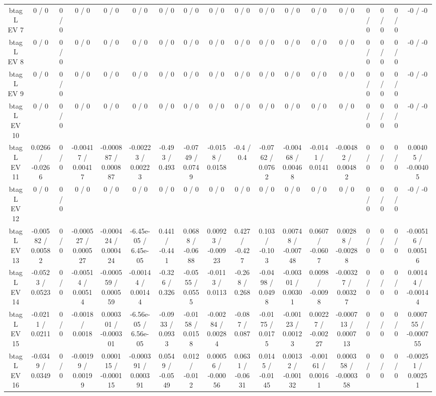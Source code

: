 \documentclass[10pt]{article}
\begin{document}
\begin{table}[htbp]
\begin{center}
\begin{tabular}{|c|c|c|c|c|c|c|c|c|c|c|c|c|c|c|c|c|c|}
  btag L EV 7 & 0 / 0 & 0 / 0 & 0 / 0 & 0 / 0 & 0 / 0 & 0 / 0 & 0 / 0 & 0 / 0 & 0 / 0 & 0 / 0 & 0 / 0 & 0 / 0 & 0 / 0 & 0 / 0 & 0 / 0 & 0 / 0 & -0 / -0 \\ 
  btag L EV 8 & 0 / 0 & 0 / 0 & 0 / 0 & 0 / 0 & 0 / 0 & 0 / 0 & 0 / 0 & 0 / 0 & 0 / 0 & 0 / 0 & 0 / 0 & 0 / 0 & 0 / 0 & 0 / 0 & 0 / 0 & 0 / 0 & -0 / -0 \\ 
  btag L EV 9 & 0 / 0 & 0 / 0 & 0 / 0 & 0 / 0 & 0 / 0 & 0 / 0 & 0 / 0 & 0 / 0 & 0 / 0 & 0 / 0 & 0 / 0 & 0 / 0 & 0 / 0 & 0 / 0 & 0 / 0 & 0 / 0 & -0 / -0 \\ 
  btag L EV 10 & 0 / 0 & 0 / 0 & 0 / 0 & 0 / 0 & 0 / 0 & 0 / 0 & 0 / 0 & 0 / 0 & 0 / 0 & 0 / 0 & 0 / 0 & 0 / 0 & 0 / 0 & 0 / 0 & 0 / 0 & 0 / 0 & -0 / -0 \\ 
  btag L EV 11 & 0.0266 / -0.0266 & 0 / 0 & -0.00417 / 0.00417 & -0.000887 / 0.000887 & -0.00223 / 0.00223 & -0.493 / 0.493 & -0.0749 / 0.0749 & -0.0158 / 0.0158 & -0.4 / 0.4 & -0.0762 / 0.0762 & -0.00468 / 0.00468 & -0.0141 / 0.0141 & -0.00482 / 0.00482 & 0 / 0 & 0 / 0 & 0 / 0 & 0.00405 / -0.00405 \\ 
  btag L EV 12 & 0 / 0 & 0 / 0 & 0 / 0 & 0 / 0 & 0 / 0 & 0 / 0 & 0 / 0 & 0 / 0 & 0 / 0 & 0 / 0 & 0 / 0 & 0 / 0 & 0 / 0 & 0 / 0 & 0 / 0 & 0 / 0 & -0 / -0 \\ 
  btag L EV 13 & -0.00582 / 0.00582 & 0 / 0 & -0.000527 / 0.000527 & -0.000424 / 0.000424 & -6.45e-05 / 6.45e-05 & 0.441 / -0.441 & 0.0688 / -0.0688 & 0.00923 / -0.00923 & 0.427 / -0.427 & 0.103 / -0.103 & 0.00748 / -0.00748 & 0.0607 / -0.0607 & 0.00288 / -0.00288 & 0 / 0 & 0 / 0 & 0 / 0 & -0.00516 / 0.00516 \\ 
  btag L EV 14 & -0.0523 / 0.0523 & 0 / 0 & -0.00514 / 0.00514 & -0.000559 / 0.000559 & -0.00144 / 0.00144 & -0.326 / 0.326 & -0.0555 / 0.0555 & -0.0113 / 0.0113 & -0.268 / 0.268 & -0.0498 / 0.0498 & -0.00301 / 0.00301 & 0.0098 / -0.0098 & -0.00327 / 0.00327 & 0 / 0 & 0 / 0 & 0 / 0 & 0.00144 / -0.00144 \\ 
  btag L EV 15 & -0.0211 / 0.0211 & 0 / 0 & -0.0018 / 0.0018 & 0.000301 / -0.000301 & -6.56e-05 / 6.56e-05 & -0.0933 / 0.0933 & -0.0158 / 0.0158 & -0.00284 / 0.00284 & -0.087 / 0.087 & -0.0175 / 0.0175 & -0.00123 / 0.00123 & 0.00227 / -0.00227 & -0.000713 / 0.000713 & 0 / 0 & 0 / 0 & 0 / 0 & 0.000755 / -0.000755 \\ 
  btag L EV 16 & -0.0349 / 0.0349 & 0 / 0 & -0.00199 / 0.00199 & 0.000115 / -0.000115 & -0.000391 / 0.000391 & 0.0549 / -0.0549 & 0.012 / -0.012 & 0.00056 / -0.00056 & 0.0631 / -0.0631 & 0.0145 / -0.0145 & 0.00132 / -0.00132 & -0.00161 / 0.00161 & 0.000358 / -0.000358 & 0 / 0 & 0 / 0 & 0 / 0 & -0.00251 / 0.00251 \\ 

\end{tabular}
\end{center}
\end{table}
\end{document}
